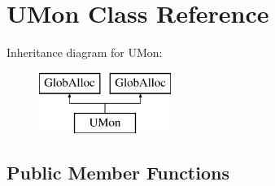 \hypertarget{classUMon}{\section{U\-Mon Class Reference}
\label{classUMon}
}
Inheritance diagram for U\-Mon\-:\begin{figure}[H]
\begin{center}
\leavevmode
\includegraphics[height=2.000000cm]{classUMon}
\end{center}
\end{figure}
\subsection*{Public Member Functions}

